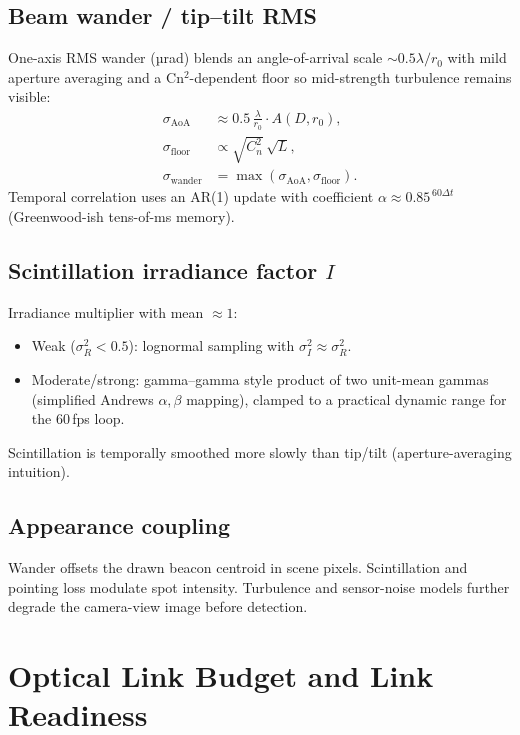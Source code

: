 \documentclass[11pt,a4paper]{article}
\begin{document}
\subsection{Beam wander / tip--tilt RMS}
One-axis RMS wander (µrad) blends an angle-of-arrival scale $\sim 0.5\lambda/r_0$ with mild aperture averaging and a Cn$^2$-dependent floor so mid-strength turbulence remains visible:
\begin{align}
\sigma_{\mathrm{AoA}}
&\approx
0.5\,\frac{\lambda}{r_0}\cdot A(D,r_0),\\
\sigma_{\mathrm{floor}}
&\propto
\sqrt{C_n^2}\,\sqrt{L},\\
\sigma_{\mathrm{wander}}
&=
\max(\sigma_{\mathrm{AoA}},\sigma_{\mathrm{floor}}).
\end{align}
Temporal correlation uses an AR(1) update with coefficient $\alpha\approx 0.85^{\,60\Delta t}$ (Greenwood-ish tens-of-ms memory).

\subsection{Scintillation irradiance factor $I$}
Irradiance multiplier with mean $\approx 1$:
\begin{itemize}[leftmargin=1.4em]
  \item Weak ($\sigma_R^2<0.5$): lognormal sampling with $\sigma_I^2\approx\sigma_R^2$.
  \item Moderate/strong: gamma--gamma style product of two unit-mean gammas (simplified Andrews $\alpha,\beta$ mapping), clamped to a practical dynamic range for the 60\,fps loop.
\end{itemize}
Scintillation is temporally smoothed more slowly than tip/tilt (aperture-averaging intuition).

\subsection{Appearance coupling}
Wander offsets the drawn beacon centroid in scene pixels.
Scintillation and pointing loss modulate spot intensity.
Turbulence and sensor-noise models further degrade the camera-view image before detection.

\section{Optical Link Budget and Link Readiness}
\end{document}
